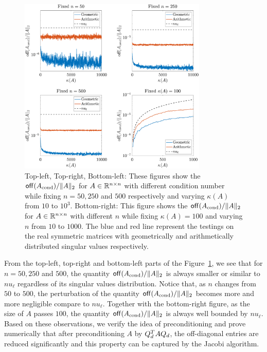 \begin{figure}[ht]
\centering
\includegraphics[width=0.8\textwidth]{figs/approx-eig.pdf}
\caption[Four comparisons of $\off(A_\text{cond})/\norm{A}$ with the reference line $nu_\ell$ where $A_\text{cond}$ is the preconditioned matrix described in the Algorithm~\ref{alg:jacobi-preconditioned}.]{Top-left, Top-right, Bottom-left: These figures show the $\mathsf{off}(A_\textup{cond})/\|{A}\|_2$ for $A\in\mathbb{R}^{n\times n}$ with different condition number while fixing $n = 50, 250$ and $500$ respectively and varying $\kappa(A)$ from $10$ to $10^3$. Bottom-right: This figure shows the $\mathsf{off}(A_\textup{cond})/\|{A}\|_2$ for $A\in\mathbb{R}^{n\times n}$ with different $n$ while fixing $\kappa(A) = 100$ and varying $n$ from $10$ to $1000$. The blue and red line represent the testings on the real symmetric matrices with geometrically and arithmetically distributed singular values respectively.}
\label{p3:fig:approx-eig-test}
\end{figure}

From the top-left, top-right and bottom-left parts of the Figure~\ref{p3:fig:approx-eig-test}, we see that for $n=50,250$ and $500$, the quantity $\off(A_\text{cond})/\norm{A}$ is always smaller or similar to $nu_\ell$ regardless of its singular values distribution. Notice that, as $n$ changes from $50$ to $500$, the perturbation of the quantity $\off(A_\text{cond})/\norm{A}$ becomes more and more negligible compare to $nu_\ell$. Together with the bottom-right figure, as the size of $A$ passes $100$, the quantity $\off(A_\text{cond})/\norm{A}$ is always well bounded by $nu_\ell$. Based on these observations, we verify the idea of preconditioning and prove numerically that after preconditioning $A$ by $Q_d^T A Q_d$, the off-diagonal entries are reduced significantly and this property can be captured by the Jacobi algorithm.



